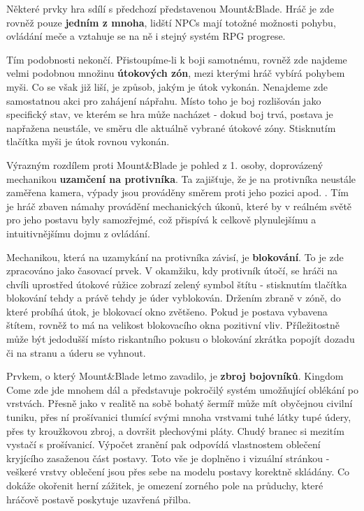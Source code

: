 Některé prvky hra sdílí s předchozí představenou Mount\&Blade. Hráč je zde rovněž pouze \textbf{jedním z mnoha}, lidští \acs{NPC}s mají totožné možnosti pohybu, ovládání meče a vztahuje se na ně i stejný systém RPG progrese.

Tím podobnosti nekončí. Přistoupíme-li k boji samotnému, rovněž zde najdeme velmi podobnou množinu \textbf{útokových zón}, mezi kterými hráč vybírá pohybem myši. Co se však již liší, je způsob, jakým je útok vykonán. Nenajdeme zde samostatnou akci pro zahájení nápřahu. Místo toho je boj rozlišován jako specifický stav, ve kterém se hra může nacházet - dokud boj trvá, postava je napřažena neustále, ve směru dle aktuálně vybrané útokové zóny. Stisknutím tlačítka myši je útok rovnou vykonán. 

Výrazným rozdílem proti Mount\&Blade je pohled z 1. osoby, doprovázený mechanikou \textbf{uzamčení na protivníka}. Ta zajišťuje, že je na protivníka neustále zaměřena kamera, výpady jsou prováděny směrem proti jeho pozici apod. . Tím je hráč zbaven námahy provádění mechanických úkonů, které by v reálném světě pro jeho postavu byly samozřejmé, což přispívá k celkově plynulejšímu a intuitivnějšímu dojmu z ovládání. 

Mechanikou, která na uzamykání na protivníka závisí, je \textbf{blokování}. To je zde zpracováno jako časovací prvek. V okamžiku, kdy protivník útočí, se hráči na chvíli uprostřed útokové růžice zobrazí zelený symbol štítu - stisknutím tlačítka blokování tehdy a právě tehdy je úder vyblokován. Držením zbraně v zóně, do které probíhá útok, je blokovací okno zvětšeno. Pokud je postava vybavena štítem, rovněž to má na velikost blokovacího okna pozitivní vliv. Příležitostně může být jedodušší místo riskantního pokusu o blokování zkrátka popojít dozadu či na stranu a úderu se vyhnout. 

Prvkem, o který Mount\&Blade letmo zavadilo, je \textbf{zbroj bojovníků}. Kingdom Come zde jde mnohem dál a představuje pokročilý systém umožňující oblékání po vrstvách. Přesně jako v realitě na sobě bohatý šermíř může mít obyčejnou civilní tuniku, přes ní prošívanici tlumící svými mnoha vrstvami tuhé látky tupé údery, přes ty kroužkovou zbroj, a dovršit plechovými pláty. Chudý branec si mezitím vystačí s prošívanicí. Výpočet zranění pak odpovídá vlastnostem oblečení kryjícího zasaženou část postavy. Toto vše je doplněno i vizuální stránkou - veškeré vrstvy oblečení jsou přes sebe na modelu postavy korektně skládány. Co dokáže okořenit herní zážitek, je omezení zorného pole na průduchy, které hráčově postavě poskytuje uzavřená přilba. 

